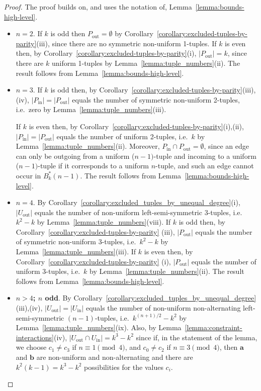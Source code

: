 \documentclass[a4paper,11pt]{article}
\begin{document}
\begin{proof}
The proof builds on, and uses the notation of, Lemma~\ref{lemma:bounds-high-level}.
\begin{itemize}

\item[i)] {\bf $n=2$}.  If $k$ is odd then $P_{\text{out}}=\emptyset$ by
    Corollary~\ref{corollary:excluded-tuples-by-parity}(iii), since there are no symmetric
    non-uniform 1-tuples.  If $k$ is even then, by
    Corollary~\ref{corollary:excluded-tuples-by-parity}(i), $|P_{\text{out}}|=k$, since there
    are $k$ uniform 1-tuples by Lemma~\ref{lemma:tuple_numbers}(ii). The result follows from
    Lemma~\ref{lemma:bounds-high-level}.

\item[ii)] {\bf $n=3$}.  If $k$ is odd then, by
    Corollary~\ref{corollary:excluded-tuples-by-parity}(iii),(iv),
    $|P_{\text{in}}|=|P_{\text{out}}|$ equals the number of symmetric non-uniform 2-tuples,
    i.e.\ zero by Lemma~\ref{lemma:tuple_numbers}(iii).

    If $k$ is even then, by Corollary~\ref{corollary:excluded-tuples-by-parity}(i),(ii),
    $|P_{\text{in}}|=|P_{\text{out}}|$ equals the number of uniform 2-tuples, i.e.\ $k$ by
    Lemma~\ref{lemma:tuple_numbers}(ii). Moreover, $P_{\text{in}}\cap
    P_{\text{out}}=\emptyset$, since an edge can only be outgoing from a uniform ($n-1)$-tuple
    and incoming to a uniform ($n-1)$-tuple if it corresponds to a uniform $n$-tuple, and such
    an edge cannot occur in $B^*_k(n-1)$. The result follows from
    Lemma~\ref{lemma:bounds-high-level}.

\item[iii)] {\bf $n=4$}. By Corollary~\ref{corollary:excluded_tuples_by_unequal_degree}(i),
    $|U_{\text{out}}|$ equals the number of non-uniform left-semi-symmetric $3$-tuples, i.e.\
    $k^2-k$ by Lemma~\ref{lemma:tuple_numbers}(viii).  If $k$ is odd then, by
    Corollary~\ref{corollary:excluded-tuples-by-parity} (iii), $|P_{\text{out}}|$ equals the
    number of symmetric non-uniform 3-tuples, i.e.\ $k^2-k$ by
    Lemma~\ref{lemma:tuple_numbers}(iii). If $k$ is even then, by
    Corollary~\ref{corollary:excluded-tuples-by-parity} (i), $|P_{\text{out}}|$ equals the
    number of uniform 3-tuples, i.e.\ $k$ by Lemma~\ref{lemma:tuple_numbers}(ii). The result
    follows from Lemma~\ref{lemma:bounds-high-level}.



\item[iv)a)] {\bf $n>4$; $n$ odd}.  By
    Corollary~\ref{corollary:excluded_tuples_by_unequal_degree}(iii),(iv),
    $|U_{\text{out}}|=|U_{\text{in}}|$ equals the number of non-uniform non-alternating
    left-semi-symmetric $(n-1)$-tuples, i.e.\ $k^{(n+1)/2}-k^2$ by
    Lemma~\ref{lemma:tuple_numbers}(ix).  Also, by
    Lemma~\ref{lemma:constraint-interactions}(iv), $|U_{\text{out}}\cap U_{\text{in}}|=k^3-k^2$
    since if, in the statement of the lemma, we choose $c_1\neq c_3$ if $n\equiv 1\pmod 4$, and
    $c_0\neq c_2$ if $n\equiv 3\pmod 4$, then $\mathbf{a}$ and $\mathbf{b}$ are non-uniform and
    non-alternating and there are $k^2(k-1)=k^3-k^2$ possibilities for the values $c_i$.


\end{itemize}
\end{proof}
\end{document}
